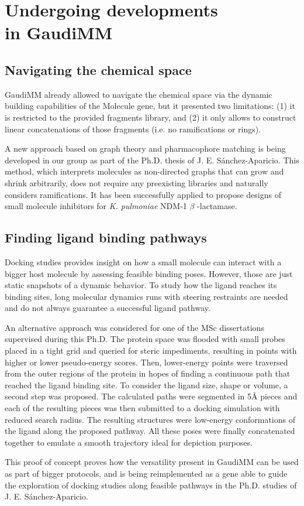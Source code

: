 \chapter[Undergoing developments in GaudiMM]{Undergoing developments \\in GaudiMM}
\label{chap:appendix-b}


\section{Navigating the chemical space}
GaudiMM already allowed to navigate the chemical space via the dynamic building capabilities of the Molecule gene, but it presented two limitations: (1) it is restricted to the provided fragments library, and (2) it only allows to construct linear concatenations of those fragments (i.e. no ramifications or rings).

A new approach based on graph theory and pharmacophore matching is being developed in our group as part of the Ph.D. thesis of J. E. Sánchez-Aparicio. This method, which interprets molecules as non-directed graphs that can grow and shrink arbitrarily, does not require any preexisting libraries and naturally considers ramifications. It has been successfully applied to propose designs of small molecule inhibitors for \textit{K. pulmoniae} NDM-1 $ \beta $ -lactamase.

\section{Finding ligand binding pathways}
Docking studies provides insight on how a small molecule can interact with a bigger host molecule by assessing feasible binding poses. However, those are just static snapshots of a dynamic behavior. To study how the ligand reaches its binding sites, long molecular dynamics runs with steering restraints are needed and do not always guarantee a successful ligand pathway.

An alternative approach was considered for one of the MSc dissertations supervised during this Ph.D. The protein space was flooded with small probes placed in a tight grid and queried for steric impediments, resulting in points with higher or lower pseudo-energy scores. Then, lower-energy points were traversed from the outer regions of the protein in hopes of finding a continuous path that reached the ligand binding site. To consider the ligand size, shape or volume, a second step was proposed. The calculated paths were segmented in 5Å pieces and each of the resulting pieces was then submitted to a docking simulation with reduced search radius. The resulting structures were low-energy conformations of the ligand along the proposed pathway. All these poses were finally concatenated together to emulate a smooth trajectory ideal for depiction purposes.

This proof of concept proves how the versatility present in GaudiMM can be used as part of bigger protocols, and is being reimplemented as a gene able to guide the exploration of docking studies along feasible pathways in the Ph.D. studies of J. E. Sánchez-Aparicio.
